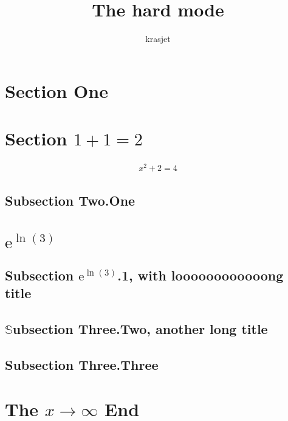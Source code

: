 \documentclass{article}[12pt]
\title{The hard mode}
\author{krasjet}
\date{}
\begin{document}
\begin{multicols}{2}
[
  \maketitle
]

\section{Section One}

\lipsum[2-3]

\section{Section $1 + 1 = 2$}

\lipsum[2-1]
\begin{align*}
  x^2 + 2 = 4
\end{align*}
\lipsum[2-1]

\subsection{Subsection Two.One}
\lipsum[2-5]

\section*{$\mathrm{e}^{\ln(3)}$}

\setcounter{section}{3}
\setcounter{subsection}{0}

\lipsum[1-2]

\subsection{Subsection $\mathrm{e}^{\ln(3)}$.1, with looo\-ooooooooong title}
\lipsum[2-5]

\subsection{$\mathbb{S}$ubsection Three.Two, another long title}
\lipsum[1-1]

\subsection{Subsection Three.Three}
\lipsum[2-3]

\section{The $x \to \infty$ End}

\lipsum[2-2]

\end{multicols}
\end{document}
